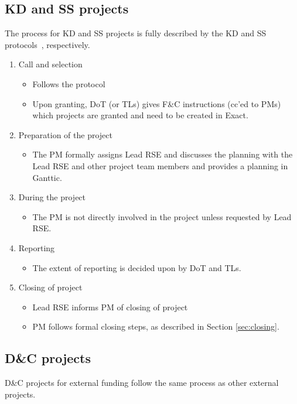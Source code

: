 \subsection{KD and SS projects}
The process for KD and SS projects is fully described by the KD and SS protocols~\cite{kd-intranet,ss-intranet}, respectively.
\begin{enumerate}[label=\arabic*.,ref=\arabic*]
\item Call and selection
\begin{itemize}
\item Follows the protocol
\item Upon granting, DoT (or TLs) gives F\&C instructions (cc'ed to PMs) which
projects are granted and need to be created in Exact.
\end{itemize}
\item Preparation of the project
\begin{itemize}
\item The PM formally assigns Lead RSE and discusses the planning with the Lead RSE and other
project team members and provides a planning in Ganttic.
\end{itemize}
\item During the project
\begin{itemize}
\item The PM is not directly involved in the project unless requested by Lead RSE.
\end{itemize}
\item Reporting
\begin{itemize}
\item The extent of reporting is decided upon by DoT and TLs.
\end{itemize}
\item Closing of project
\begin{itemize}
\item Lead RSE informs PM of closing of project
\item PM follows formal closing steps, as described in Section \ref{sec:closing}.
\end{itemize}
\end{enumerate}

\subsection{D\&C projects}
D\&C projects for external funding follow the same process as other external projects.

